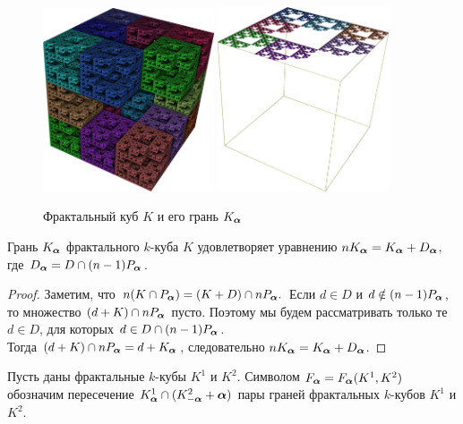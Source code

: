 \begin{figure}[h!]
\centering
\includegraphics[width=0.45\textwidth]{images/presentation/qK.png}
 \hfill
 \includegraphics[width=0.45\textwidth]{images/presentation/qK_a.png}
  \caption{Фрактальный куб $K$ и его грань $K_{\bm{\alpha}}$}
 \label{fig:qK_a}
\end{figure}

\begin{proposition}\label{prop:Ka}
Грань $K_{\bm{\alpha}}$ фрактального $k$-куба $K$ удовлетворяет уравнению $n K_{\bm{\alpha}}=K_{\bm{\alpha}}+D_{\bm{\alpha}}$, где $D_{\bm{\alpha}}=D\cap(n-1)P_{\bm{\alpha}}$.
\end{proposition}

\begin{proof}
Заметим, что $n(K\cap P_{\bm{\alpha}})=(K+D)\cap nP_{\bm{\alpha}}.$ 
Если $d\in D$ и \linebreak $d\notin(n-1)P_{\bm{\alpha}}$, то множество $(d+K)\cap nP_{\bm{\alpha}}$ пусто.
Поэтому мы будем рассматривать только те $d\in D$, для которых $d\in D\cap (n-1)P_{\bm{\alpha}}$.\\ 
Тогда $(d+K)\cap nP_{\bm{\alpha}}=d+K_{\bm{\alpha}}$, следовательно $n K_{\bm{\alpha}}={K_{\bm{\alpha}}+D_{\bm{\alpha}}}$.
\end{proof}

\begin{definition}\label{def:F_alpha}
Пусть даны фрактальные $k$-кубы $K^1$ и $K^2$.
Символом $F_{\bm{\alpha}}=F_{\bm{\alpha}}(K^1,K^2)$ обозначим пересечение $K^1_{\bm{\alpha}}\cap(K^2_{-{\bm{\alpha}}}+{\bm{\alpha}})$ пары граней фрактальных $k$-кубов $K^1$ и $K^2$.
\end{definition}

